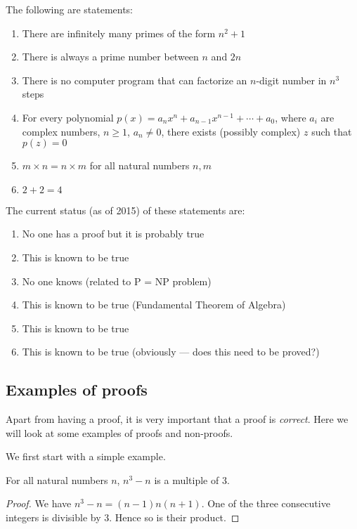 \documentclass[a4paper]{article}
\begin{document}
\begin{eg}
  The following are statements:
  \begin{enumerate}
    \item There are infinitely many primes of the form $n^2 + 1$
    \item There is always a prime number between $n$ and $2n$
    \item There is no computer program that can factorize an $n$-digit number in $n^3$ steps
    \item For every polynomial $p(x) = a_nx^n + a_{n - 1}x^{n - 1} + \cdots + a_0$, where $a_i$ are complex numbers, $n\geq 1$, $a_n \not=0$, there exists (possibly complex) $z$ such that $p(z) = 0$
    \item $m\times n = n\times m$ for all natural numbers $n, m$
    \item $2 + 2 = 4$
  \end{enumerate}
  The current status (as of 2015) of these statements are:
  \begin{enumerate}
    \item No one has a proof but it is probably true
    \item This is known to be true
    \item No one knows (related to P = NP problem)
    \item This is known to be true (Fundamental Theorem of Algebra)
    \item This is known to be true
    \item This is known to be true (obviously --- does this need to be proved?)
  \end{enumerate}
\end{eg}

\subsection{Examples of proofs}
Apart from having a proof, it is very important that a proof is \emph{correct}. Here we will look at some examples of proofs and non-proofs.

We first start with a simple example.
\begin{prop}
  For all natural numbers $n$, $n^3 - n$ is a multiple of 3.
\end{prop}

\begin{proof}
  We have $n^3 - n = (n - 1)n(n + 1)$. One of the three consecutive integers is divisible by 3. Hence so is their product.
\end{proof}
\end{document}
